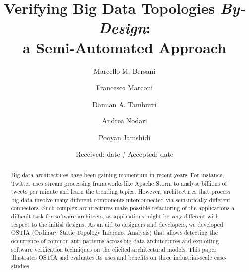 \documentclass[smallextended]{svjour3}       %
\begin{document}
\title{Verifying Big Data Topologies \emph{By-Design}:\\ a Semi-Automated Approach}


\author{Marcello M. Bersani \and Francesco Marconi \and Damian A. Tamburri \and Andrea Nodari \and Pooyan Jamshidi}



\date{Received: date / Accepted: date}


\maketitle

\begin{abstract}
Big data architectures have been gaining momentum in recent years. For
instance, Twitter uses stream processing frameworks like Apache Storm to analyse billions of tweets per minute and learn the trending topics. However, architectures that process big data involve many different components interconnected via semantically different connectors. 
Such complex architectures make %
possible refactoring of the applications a difficult task for software architects, as applications might be very different with respect to the initial designs.
As an aid to designers and developers, we developed OSTIA (Ordinary Static Topology Inference Analysis) that allows detecting the occurrence of common anti-patterns across big data architectures and exploiting software verification techniques on the elicited architectural models. This paper illustrates OSTIA and evaluates its uses and benefits on three industrial-scale case-studies.
\end{abstract}
\end{document}
